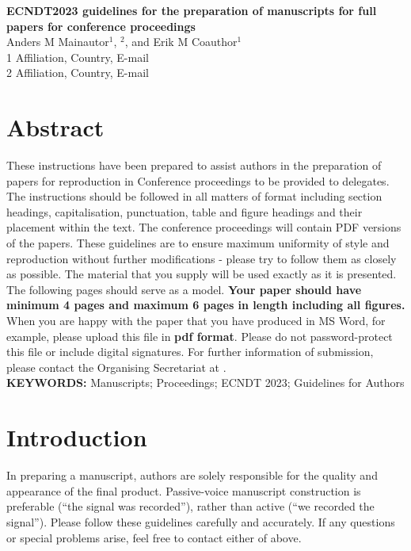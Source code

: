 \documentclass[12pt, a4paper]{article}
\newcommand{\myhy}[2]{\href{#1}{\color{blue}\setulcolor{blue}\underline{\smash{{#2}}}}}
\newcommand*{\email}[1]{\myhy{mailto:#1}{#1}}
\begin{document}
\thispagestyle{firststyle}

\begin{center}
  \large
  \textbf{ECNDT2023 guidelines for the preparation of manuscripts for full papers for conference proceedings
  }\\[2em]

  \normalsize
  Anders M Mainautor$^1$, \underline{}$^2$, and Erik M Coauthor$^1$ \\
  1 Affiliation, Country, E-mail\\
  2 Affiliation, Country, E-mail\\[2em]
\end{center}

\section*{Abstract}
These instructions have been prepared to assist authors in the preparation of papers for reproduction in Conference proceedings to be provided to delegates. The instructions should be followed in all matters of format including section headings, capitalisation, punctuation, table and figure headings and their placement within the text. The conference proceedings will contain PDF versions of the papers. These guidelines are to ensure maximum uniformity of style and reproduction without further modifications - please try to follow them as closely as possible. The material that you supply will be used exactly as it is presented. The following pages should serve as a model. \textbf{Your paper should have minimum 4 pages and maximum 6 pages in length including all figures.} When you are happy with the paper that you have produced in MS Word, for example, please upload this file in \textbf{pdf format}. Please do not password-protect this file or include digital signatures. For further information of submission, please contact the Organising Secretariat at \email{ecndt2023.abstracts@aimgroup.eu}.\\[1em]
\textbf{KEYWORDS: } Manuscripts; Proceedings; ECNDT 2023; Guidelines for Authors

\afterpage{\globaldefs=1 \restoregeometry}
\pagestyle{fancy}
\setlength{\abovedisplayskip}{1em}
\setlength{\belowdisplayskip}{1em}
\setlength{\abovedisplayshortskip}{1em}
\setlength{\belowdisplayshortskip}{1em}

\section{Introduction}
In preparing a manuscript, authors are solely responsible for the quality and appearance of the final product. Passive-voice manuscript construction is preferable (“the signal was recorded”), rather than active (“we recorded the signal”). Please follow these guidelines carefully and accurately. If any questions or special problems arise, feel free to contact either of above.
\end{document}

